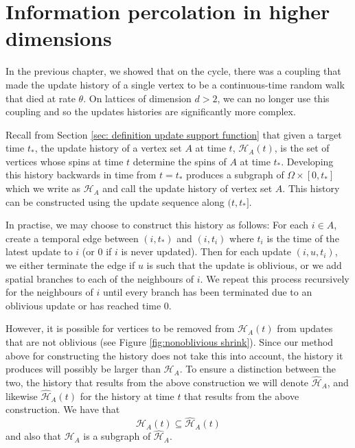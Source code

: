 \section{Information percolation in higher dimensions}
\label{sec:information percolation in higher dimensions}
In the previous chapter, we showed that on the cycle, there was a coupling that made the update history of a single vertex to be a continuous-time random walk that died at rate $\theta$. On lattices of dimension $d > 2$, we can no longer use this coupling and so the updates histories are significantly more complex. 

Recall from Section \ref{sec: definition update support function} that given a target time $t_*$, the update history of a vertex set $A$ at time $t$, $\mathcal{H}_A(t)$, is the set of vertices whose spins at time $t$ determine the spins of $A$ at time $t_*$. Developing this history backwards in time from $t = t_*$ produces a subgraph of $\Omega \times [0, t_*]$ which we write as $\mathcal{H}_A$ and call the update history of vertex set $A$. This history can be constructed using the update sequence along $(t, t_*]$. 

In practise, we may choose to construct this history as follows: For each $i \in A$, create a temporal edge between $(i, t_*)$ and $(i, t_i)$ where $t_i$ is the time of the latest update to $i$ (or $0$ if $i$ is never updated). Then for each update $(i, u, t_i)$, we either terminate the edge if $u$ is such that the update is oblivious, or we add spatial branches to each of the neighbours of $i$. We repeat this process recursively for the neighbours of $i$ until every branch has been terminated due to an oblivious update or has reached time $0$.

However, it is possible for vertices to be removed from $\mathcal{H}_A(t)$ from updates that are not oblivious (see Figure \ref{fig:nonoblivious shrink}). Since our method above for constructing the history does not take this into account, the history it produces will possibly be larger than $\mathcal{H}_A$. To ensure a distinction between the two, the history that results from the above construction we will denote $\hat{\mathcal{H}}_A$, and likewise $\hat{\mathcal{H}}_A(t)$ for the history at time $t$ that results from the above construction. We have that
\begin{equation}
	\mathcal{H}_A(t) \subseteq \hat{\mathcal{H}}_A(t)
\end{equation}
and also that $\mathcal{H}_A$ is a subgraph of $\hat{\mathcal{H}}_A$.

